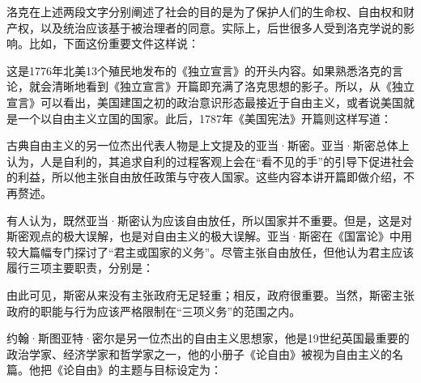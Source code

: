 洛克在上述两段文字分别阐述了社会的目的是为了保护人们的生命权、自由权和财产权，以及统治应该基于被治理者的同意。实际上，后世很多人受到洛克学说的影响。比如，下面这份重要文件这样说：


这是1776年北美13个殖民地发布的《独立宣言》的开头内容。如果熟悉洛克的言论，就会清晰地看到《独立宣言》开篇即充满了洛克思想的影子。所以，从《独立宣言》可以看出，美国建国之初的政治意识形态最接近于自由主义，或者说美国就是一个以自由主义立国的国家。此后，1787年《美国宪法》开篇则这样写道：


古典自由主义的另一位杰出代表人物是上文提及的亚当·斯密。亚当·斯密总体上认为，人是自利的，其追求自利的过程客观上会在“看不见的手”的引导下促进社会的利益，所以他主张自由放任政策与守夜人国家。这些内容本讲开篇即做介绍，不再赘述。

有人认为，既然亚当·斯密认为应该自由放任，所以国家并不重要。但是，这是对斯密观点的极大误解，也是对自由主义的极大误解。亚当·斯密在《国富论》中用较大篇幅专门探讨了“君主或国家的义务”。尽管主张自由放任，但他认为君主应该履行三项主要职责，分别是：


由此可见，斯密从来没有主张政府无足轻重；相反，政府很重要。当然，斯密主张政府的职能与行为应该严格限制在“三项义务”的范围之内。

约翰·斯图亚特·密尔是另一位杰出的自由主义思想家，他是19世纪英国最重要的政治学家、经济学家和哲学家之一，他的小册子《论自由》被视为自由主义的名篇。他把《论自由》的主题与目标设定为：


